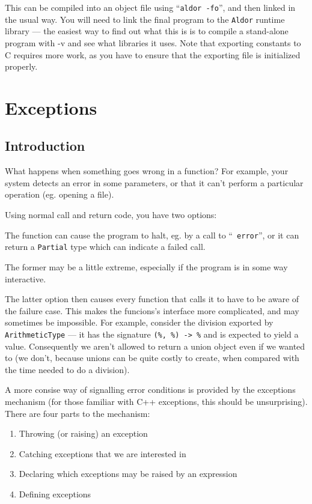 \documentclass{article}
\newcommand{\Aldor}{{\tt Aldor}}
\begin{document}
This can be compiled into an object file using ``{\tt aldor -fo}'',
and then linked in the usual way.  You will need to link the final
program to the \Aldor{} runtime library --- the easiest way to find
out what this is is to compile a stand-alone program with -v and see what
libraries it uses.  Note that exporting constants to C requires more
work, as you have to ensure that the exporting file is initialized
properly.

\section{Exceptions}


\subsection{Introduction}

What happens when something goes wrong in a function?  For example,
your system detects an error in some parameters, or that it can't
perform a particular operation (eg. opening a file).

Using normal call and return code, you have two options:

The function can cause the program to halt, eg. by a call to ``{\tt
error}'', or it can return a {\tt Partial} type which can indicate a
failed call.


The former may be a little extreme, especially if the program is in
some way interactive.

The latter option then causes every function that calls it to have to
be aware of the failure case.  This makes the funcions's interface
more complicated, and may sometimes be impossible.  For example,
consider the division exported by {\tt ArithmeticType} --- it has the
signature {\tt (\%, \%) -> \%} and is expected to yield a value.
Consequently we aren't allowed to return a union object even if we
wanted to (we don't, because unions can be quite costly to
create, when compared with the time needed to do a division).

A more consise way of signalling error conditions is provided by the
exceptions mechanism (for those familiar with C++ exceptions,
this should be unsurprising).  There are four parts to the mechanism:
\begin{enumerate}
\item Throwing (or raising) an exception
\item Catching exceptions that we are interested in
\item Declaring which exceptions may be raised by an expression
\item Defining exceptions
\end{enumerate}
\end{document}

